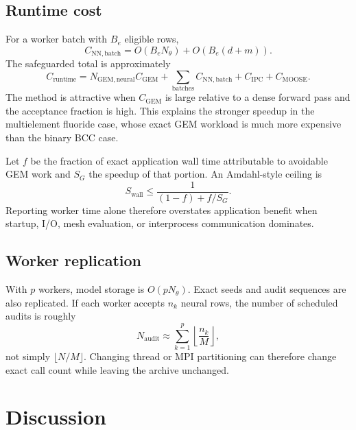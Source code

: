 \documentclass[11pt]{article}
\begin{document}
\subsection{Runtime cost}

For a worker batch with \(B_e\) eligible rows,
\begin{equation}
  C_{\mathrm{NN,batch}}
  =O(B_eN_{\theta})+O(B_e(d+m)).
  \label{eq:inference-cost}
\end{equation}
The safeguarded total is approximately
\begin{equation}
  C_{\mathrm{runtime}}
  =
  N_{\mathrm{GEM,neural}}C_{\mathrm{GEM}}
  +\sum_{\mathrm{batches}}C_{\mathrm{NN,batch}}
  +C_{\mathrm{IPC}}+C_{\mathrm{MOOSE}}.
  \label{eq:runtime-cost}
\end{equation}
The method is attractive when \(C_{\mathrm{GEM}}\) is large relative to a dense forward pass and
the acceptance fraction is high.  This explains the stronger speedup in the multielement fluoride
case, whose exact GEM workload is much more expensive than the binary BCC case.

Let \(f\) be the fraction of exact application wall time attributable to avoidable GEM work and
\(S_G\) the speedup of that portion.  An Amdahl-style ceiling is
\begin{equation}
  S_{\mathrm{wall}}
  \leq\frac{1}{(1-f)+f/S_G}.
  \label{eq:amdahl}
\end{equation}
Reporting worker time alone therefore overstates application benefit when startup, I/O, mesh
evaluation, or interprocess communication dominates.

\subsection{Worker replication}

With \(p\) workers, model storage is \(O(pN_{\theta})\).  Exact seeds and audit sequences are also
replicated.  If each worker accepts \(n_k\) neural rows, the number of scheduled audits is roughly
\begin{equation}
  N_{\mathrm{audit}}\approx
  \sum_{k=1}^{p}\left\lfloor\frac{n_k}{M}\right\rfloor,
  \label{eq:worker-audits}
\end{equation}
not simply \(\lfloor N/M\rfloor\).  Changing thread or MPI partitioning can therefore change exact
call count while leaving the archive unchanged.

\section{Discussion}
\end{document}
